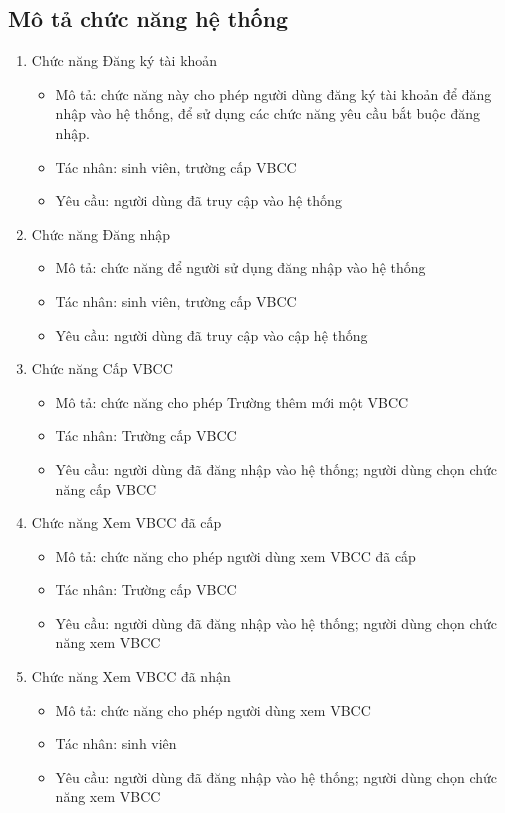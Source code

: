 \subsection{Mô tả chức năng hệ thống}
\begin{enumerate}
\item 
Chức năng Đăng ký tài khoản
\begin{itemize}
\item Mô tả: chức năng này cho phép người dùng đăng ký tài khoản để đăng nhập vào hệ thống, để sử dụng các chức năng yêu cầu bắt buộc đăng nhập.
\item Tác nhân: sinh viên, trường cấp VBCC 
\item Yêu cầu: người dùng đã truy cập vào hệ thống 
\end{itemize}

\item 
Chức năng Đăng nhập
\begin{itemize}
\item Mô tả: chức năng để người sử dụng đăng nhập vào hệ thống
\item Tác nhân: sinh viên, trường cấp VBCC
\item Yêu cầu: người dùng đã truy cập vào cập hệ thống
\end{itemize}

\item 
Chức năng Cấp VBCC
\begin{itemize}
\item Mô tả: chức năng cho phép Trường thêm mới một VBCC 
\item Tác nhân: Trường cấp VBCC
\item Yêu cầu: người dùng đã đăng nhập vào hệ thống; người dùng chọn chức năng cấp VBCC
\end{itemize}

\item 
Chức năng Xem VBCC đã cấp
\begin{itemize}
\item Mô tả: chức năng cho phép người dùng xem VBCC đã cấp 
\item Tác nhân: Trường cấp VBCC 
\item Yêu cầu: người dùng đã đăng nhập vào hệ thống; người dùng chọn chức năng xem VBCC
\end{itemize}

\item 
Chức năng Xem VBCC đã nhận
\begin{itemize}
\item Mô tả: chức năng cho phép người dùng xem VBCC 
\item Tác nhân: sinh viên
\item Yêu cầu: người dùng đã đăng nhập vào hệ thống; người dùng chọn chức năng xem VBCC
\end{itemize}


\end{enumerate}
